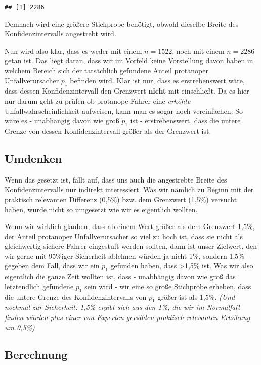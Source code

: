 \documentclass[
]{article}
\begin{document}
\begin{verbatim}
## [1] 2286
\end{verbatim}

Demnach wird eine größere Stichprobe benötigt, obwohl dieselbe Breite
des Konfidenzintervalls angestrebt wird.

Nun wird also klar, dass es weder mit einem \(n=1522\), noch mit einem
\(n=2286\) getan ist. Das liegt daran, dass wir im Vorfeld keine
Vorstellung davon haben in welchem Bereich sich der tatsächlich
gefundene Anteil protanoper Unfallverursacher \(p_1\) befinden wird.
Klar ist nur, dass es erstrebenswert wäre, dass dessen
Konfidenzintervall den Grenzwert \textbf{nicht} mit einschließt. Da es
hier nur darum geht zu prüfen ob protanope Fahrer eine \emph{erhöhte}
Unfallwahrscheinlichkeit aufweisen, kann man es sogar noch vereinfachen:
So wäre es - unabhängig davon wie groß \(p_1\) ist - erstrebenswert,
dass die untere Grenze von dessen Konfidenzintervall größer als der
Grenzwert ist.

\hypertarget{umdenken}{%
\subsection{Umdenken}\label{umdenken}}

Wenn das gesetzt ist, fällt auf, dass uns auch die angestrebte Breite
des Konfidenzintervalls nur indirekt interessiert. Was wir nämlich zu
Beginn mit der praktisch relevanten Differenz (0,5\%) bzw. dem Grenzwert
(1,5\%) versucht haben, wurde nicht so umgesetzt wie wir es eigentlich
wollten.

Wenn wir wirklich glauben, dass ab einem Wert größer als dem Grenzwert
1,5\%, der Anteil protanoper Unfallverursacher so viel zu hoch ist, dass
sie nicht als gleichwertig sichere Fahrer eingestuft werden sollten,
dann ist unser Zielwert, den wir gerne mit 95\%iger Sicherheit ablehnen
würden ja nicht 1\%, sondern 1,5\% - gegeben dem Fall, dass wir ein
\(p_1\) gefunden haben, dass \textgreater{}1,5\% ist. Was wir also
eigentlich die ganze Zeit wollten ist, dass - unabhängig davon wie groß
das letztendlich gefundene \(p_1\) sein wird - wir eine so große
Stichprobe erheben, dass die untere Grenze des Konfidenzintervalls von
\(p_1\) größer ist als 1,5\%. \emph{(Und nochmal zur Sicherheit: 1,5\%
ergibt sich aus den 1\%, die wir im Normalfall finden würden plus einer
von Experten gewählen praktisch relevanten Erhöhung um 0,5\%)}

\hypertarget{berechnung}{%
\subsection{Berechnung}\label{berechnung}}
\end{document}
